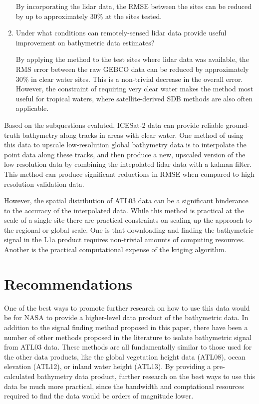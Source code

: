 \begin{enumerate}
    By incorporating the lidar data, the RMSE between the sites can be reduced by up to approximately 30\% at the sites tested.
    
    \item Under what conditions can remotely-sensed lidar data provide useful improvement on bathymetric data estimates?
    
    By applying the method to the test sites where lidar data was available, the RMS error between the raw GEBCO data can be reduced by approximately 30\% in clear water sites. This is a non-trivial decrease in the overall error. However, the constraint of requiring very clear water makes the method most useful for tropical waters, where satellite-derived SDB methods are also often applicable. 

\end{enumerate}


Based on the subquestions evaluted, ICESat-2 data can provide reliable ground-truth bathymetry along tracks in areas with clear water. One method of using this data to upscale low-resolution global bathymetry data is to interpolate the point data along these tracks, and then produce a new, upscaled version of the low resolution data by combining the intepolated lidar data with a kalman filter. This method can produce significant reductions in RMSE when compared to high resolution validation data. 

However, the spatial distribution of ATL03 data can be a significant hinderance to the accuracy of the interpolated data. While this method is practical at the scale of a single site  there are practical constraints on scaling up the approach to the regional or global scale. One is that downloading and finding the bathymetric signal in the L1a product requires non-trivial amounts of computing resources. Another is the practical computational expense of the kriging algorithm.

\section{Recommendations}
One of the best ways to promote further research on how to use this data would be for NASA to provide a higher-level data product of the bathymetric data. In addition to the signal finding method proposed in this paper, there have been a number of other methods proposed in the literature to isolate bathymetric signal from ATL03 data. These methods are all fundamentally similar to those used for the other data products, like the global vegetation height data (ATL08), ocean elevation (ATL12), or inland water height (ATL13). By providing a pre-calculated bathymetry data product, further research on the best ways to use this data be much more practical, since the bandwidth and comptational resources required to find the data would be orders of magnitude lower.

